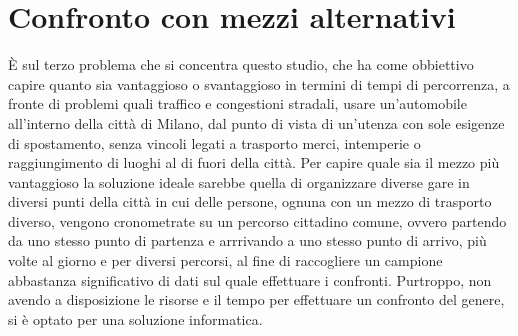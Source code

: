 \section{Confronto con mezzi alternativi}

È sul terzo problema che si concentra questo studio, che ha come obbiettivo capire quanto sia vantaggioso o svantaggioso in termini di tempi di percorrenza, a fronte di problemi quali traffico e congestioni stradali, usare un'automobile all'interno della città di Milano, dal punto di vista di un'utenza con sole esigenze di spostamento, senza vincoli legati a trasporto merci, intemperie o raggiungimento di luoghi al di fuori della città. Per capire quale sia il mezzo più vantaggioso la soluzione ideale sarebbe quella di organizzare diverse gare in diversi punti della città in cui delle persone, ognuna con un mezzo di trasporto diverso, vengono cronometrate su un percorso cittadino comune, ovvero partendo da uno stesso punto di partenza e arrrivando a uno stesso punto di arrivo, più volte al giorno e per diversi percorsi, al fine di raccogliere un campione abbastanza significativo di dati sul quale effettuare i confronti. Purtroppo, non avendo a disposizione le risorse e il tempo per effettuare un confronto del genere, si è optato per una soluzione informatica.